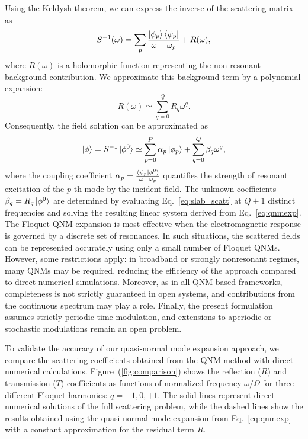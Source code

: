 \documentclass[%
 reprint,
 amsmath,amssymb,
 aps,
 prb,
]{revtex4-2}
\newcommand{\corrections}[1]{#1}
\begin{document}
Using the Keldysh theorem, we can express the inverse of the scattering matrix as
\begin{equation}
S^{-1}(\omega) = \sum_{p} \frac{\ket{\phi_p} \bra{\psi_p}}{\omega-\omega_p} + R(\omega),
\label{eq:keldysh1}
\end{equation}
where $R(\omega)$ is a holomorphic function representing the non-resonant background contribution. We approximate this background term by a polynomial expansion:
\begin{equation}
R(\omega) \simeq \sum_{q=0}^{Q} R_q\omega^q.
\label{eq:pol}
\end{equation}
Consequently, the field solution can be approximated as
\begin{equation}
\ket{\phi} = S^{-1}\ket{\phi^0} \simeq \sum_{p=0}^{P} \alpha_p \ket{\phi_p} + \sum_{q=0}^{Q} \beta_q\omega^q,
\label{eq:qnmexp}
\end{equation}
where the coupling coefficient $\alpha_p = \frac{\braket{\psi_p | \phi^0}}{\omega-\omega_p}$ quantifies the strength of resonant excitation of the $p$-th mode by the incident field. The unknown coefficients $\beta_q = R_q\ket{\phi^0}$ are determined by evaluating Eq.~\eqref{eq:slab_scatt} at $Q+1$ distinct frequencies and solving the resulting linear system derived from Eq.~\eqref{eq:qnmexp}.
\corrections{The Floquet QNM expansion is most effective when the electromagnetic response is governed by a discrete set of resonances. In such situations, the scattered fields can be represented accurately using only a small number of Floquet QNMs. However, some restrictions apply: in broadband or strongly nonresonant regimes, many QNMs may be required, reducing the efficiency of the approach compared to direct numerical simulations. Moreover, as in all QNM-based frameworks, completeness is not strictly guaranteed in open systems, and contributions from the continuous spectrum may play a role. Finally, the present formulation assumes strictly periodic time modulation, and extensions to aperiodic or stochastic modulations remain an open problem.
}

To validate the accuracy of our quasi-normal mode expansion approach, we compare the scattering coefficients obtained from the QNM method with direct numerical calculations. Figure~(\ref{fig:comparison}) shows the reflection ($R$) and transmission ($T$) coefficients as functions of normalized frequency $\omega/\Omega$ for three different Floquet harmonics: $q = -1, 0, +1$. The solid lines represent direct numerical solutions of the full scattering problem, while the dashed lines show the results obtained using the quasi-normal mode expansion from Eq.~\eqref{eq:qnmexp} with a constant approximation for the residual term $R$.
\end{document}
